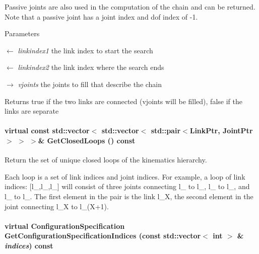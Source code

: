 Passive joints are also used in the computation of the chain and can be returned. Note that a passive joint has a joint index and dof index of -\/1. 
\begin{DoxyParams}{Parameters}
\item[\mbox{$\leftarrow$} {\em linkindex1}]the link index to start the search \item[\mbox{$\leftarrow$} {\em linkindex2}]the link index where the search ends \item[\mbox{$\rightarrow$} {\em vjoints}]the joints to fill that describe the chain \end{DoxyParams}
\begin{DoxyReturn}{Returns}
true if the two links are connected (vjoints will be filled), false if the links are separate 
\end{DoxyReturn}
\hypertarget{classOpenRAVE_1_1KinBody_a6eb3b9da2ed2b9b8eec770f018bbeb19}{
\paragraph[{GetClosedLoops}]{\setlength{\rightskip}{0pt plus 5cm}virtual const std::vector$<$ std::vector$<$ std::pair$<$LinkPtr, JointPtr$>$ $>$ $>$\& GetClosedLoops () const}\hfill}
\label{classOpenRAVE_1_1KinBody_a6eb3b9da2ed2b9b8eec770f018bbeb19}


Return the set of unique closed loops of the kinematics hierarchy. 

Each loop is a set of link indices and joint indices. For example, a loop of link indices: \mbox{[}l\_,l\_,l\_\mbox{]} will consist of three joints connecting l\_ to l\_, l\_ to l\_, and l\_ to l\_. The first element in the pair is the link l\_\-X, the second element in the joint connecting l\_\-X to l\_\-(X+1). \hypertarget{classOpenRAVE_1_1KinBody_af7fef3f4f3e970937d82cac5b2e25dc6}{
\paragraph[{GetConfigurationSpecificationIndices}]{\setlength{\rightskip}{0pt plus 5cm}virtual {\bf ConfigurationSpecification} GetConfigurationSpecificationIndices (const std::vector$<$ int $>$ \& {\em indices}) const}\hfill}
\label{classOpenRAVE_1_1KinBody_af7fef3f4f3e970937d82cac5b2e25dc6}


